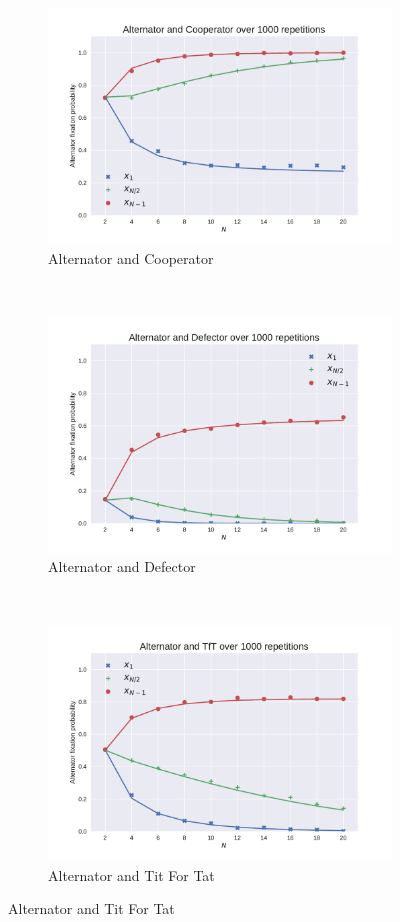 \documentclass{article}
\begin{document}
\begin{figure}[!hbtp]
    \centering
    \begin{subfigure}[t]{.3\textwidth}
        \centering
        \includegraphics[width=.8\textwidth]{./img/Alternator_v_Cooperator.pdf}
        \caption{Alternator and Cooperator}
    \end{subfigure}%
    ~
    \begin{subfigure}[t]{.3\textwidth}
        \centering
        \includegraphics[width=.8\textwidth]{./img/Alternator_v_Defector.pdf}
        \caption{Alternator and Defector}
    \end{subfigure}%
    ~
    \begin{subfigure}[t]{.3\textwidth}
        \centering
        \includegraphics[width=.8\textwidth]{./img/Alternator_v_TfT.pdf}
        \caption{Alternator and Tit For Tat}
    \end{subfigure}%


\end{figure}
\end{document}
